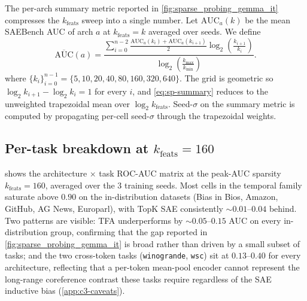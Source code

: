 The per-arch summary metric reported in \cref{fig:sparse_probing_gemma_it} compresses the $k_{\mathrm{feats}}$ sweep into a single number. Let $\mathrm{AUC}_a(k)$ be the mean SAEBench AUC of arch $a$ at $k_{\mathrm{feats}} = k$ averaged over seeds. We define
\begin{equation}
\overline{\mathrm{AUC}}(a)
=
\frac{\displaystyle \sum_{i=0}^{n-2}
\frac{\mathrm{AUC}_a(k_i)+\mathrm{AUC}_a(k_{i+1})}{2}
\log_2\!\left(\frac{k_{i+1}}{k_i}\right)}
{\displaystyle \log_2\!\left(\frac{k_{\max}}{k_{\min}}\right)}.
\label{eq:sp-summary}
\end{equation}
where $\{k_i\}_{i=0}^{n-1} = \{5, 10, 20, 40, 80, 160, 320, 640\}$. The grid is geometric so $\log_2 k_{i+1} - \log_2 k_i = 1$ for every $i$, and \cref{eq:sp-summary} reduces to the unweighted trapezoidal mean over $\log_2 k_{\mathrm{feats}}$. Seed-$\sigma$ on the summary metric is computed by propagating per-cell seed-$\sigma$ through the trapezoidal weights.

\subsection{Per-task breakdown at $k_{\mathrm{feats}} = 160$}
\label{app:c3-per-task}

 shows the architecture $\times$ task ROC-AUC matrix at the peak-AUC sparsity $k_{\mathrm{feats}} = 160$, averaged over the $3$ training seeds. Most cells in the temporal family saturate above $0.90$ on the in-distribution datasets (Bias in Bios, Amazon, GitHub, AG News, Europarl), with TopK SAE consistently $\sim\!0.01$--$0.04$ behind. Two patterns are visible: TFA underperforms by $\sim\!0.05$--$0.15$ AUC on every in-distribution group, confirming that the gap reported in \cref{fig:sparse_probing_gemma_it} is broad rather than driven by a small subset of tasks; and the two cross-token tasks (\texttt{winogrande}, \texttt{wsc}) sit at $0.13$--$0.40$ for every architecture, reflecting that a per-token mean-pool encoder cannot represent the long-range coreference contrast these tasks require regardless of the SAE inductive bias (\cref{app:c3-caveats}).


